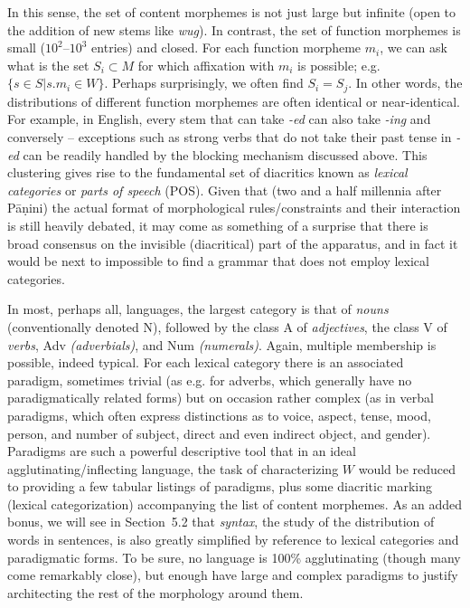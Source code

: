 In this sense, the set of content morphemes is not just large but infinite
(open to the addition of new stems like {\it wug}). In contrast, the set of
function morphemes is small ($10^2$--$10^3$ entries) and closed. For each
function morpheme $m_i$, we can ask what is the set $S_i \subset M$ for which
affixation with $m_i$ is possible; e.g.  $\{s \in S | s.m_i \in W\}$. Perhaps
surprisingly, we often find $S_i = S_j$. In other words, the distributions of
different function morphemes are often identical or near-identical. For
example, in English, every stem that can take {\it -ed} can also take {\it
  -ing} and conversely -- exceptions such as strong verbs that do not take
their past tense in {\it -ed} can be readily handled by the blocking mechanism
discussed above.  This clustering gives rise to the fundamental set of
diacritics known as {\it lexical categories} or {\it parts of speech}
(POS).  Given that (two and
a half millennia after P\={a}\d{n}ini) the actual format of morphological
rules/constraints and their interaction is still heavily debated, it may come
as something of a surprise that there is broad consensus on the invisible
(diacritical) part of the apparatus, and in fact it would be next to
impossible to find a grammar that does not employ lexical categories.

In most, perhaps all, languages, the largest category is that of {\it nouns}
(conventionally denoted N), followed by the class A of {\it adjectives}, the
class V of {\it verbs}, Adv {\it (adverbials)}, and Num {\it
  (numerals)}.
Again, multiple membership is possible, indeed typical. For each lexical
category there is an associated paradigm, sometimes trivial (as e.g. for
adverbs, which generally have no paradigmatically related forms) but on
occasion rather complex (as in verbal paradigms, which often express
distinctions as to voice, aspect, tense, mood, person, and number of subject,
direct and even indirect object, and gender). Paradigms are such a powerful
descriptive tool that in an ideal agglutinating/inflecting language, the task
of characterizing $W$ would be reduced to providing a few tabular listings of
paradigms, plus some diacritic marking (lexical categorization) accompanying
the list of content morphemes.  As an added bonus, we will see in Section~5.2
that {\it syntax}, the study of the distribution of words in sentences, is
also greatly simplified by reference to lexical categories and paradigmatic
forms.  To be sure, no language is 100\% agglutinating (though many come
remarkably close), but enough have large and complex paradigms to justify
architecting the rest of the morphology around them.

